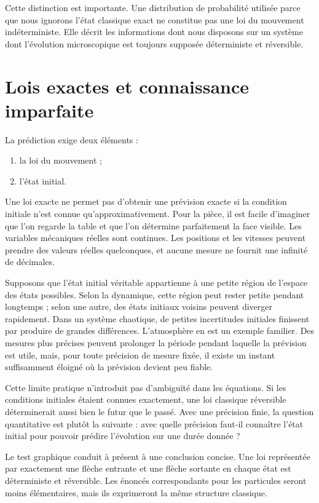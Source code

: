 Cette distinction est importante. Une distribution de probabilité utilisée parce que nous ignorons l’état classique exact ne constitue pas une loi du mouvement indéterministe. Elle décrit les informations dont nous disposons sur un système dont l’évolution microscopique est toujours supposée déterministe et réversible.

\section{Lois exactes et connaissance imparfaite}

La prédiction exige deux éléments :
\begin{enumerate}
  \item la loi du mouvement ;
  \item l’état initial.
\end{enumerate}
Une loi exacte ne permet pas d’obtenir une prévision exacte si la condition initiale n’est connue qu’approximativement. Pour la pièce, il est facile d’imaginer que l’on regarde la table et que l’on détermine parfaitement la face visible. Les variables mécaniques réelles sont continues. Les positions et les vitesses peuvent prendre des valeurs réelles quelconques, et aucune mesure ne fournit une infinité de décimales.

Supposons que l’état initial véritable appartienne à une petite région de l’espace des états possibles. Selon la dynamique, cette région peut rester petite pendant longtemps ; selon une autre, des états initiaux voisins peuvent diverger rapidement. Dans un système chaotique, de petites incertitudes initiales finissent par produire de grandes différences. L’atmosphère en est un exemple familier. Des mesures plus précises peuvent prolonger la période pendant laquelle la prévision est utile, mais, pour toute précision de mesure fixée, il existe un instant suffisamment éloigné où la prévision devient peu fiable.

Cette limite pratique n’introduit pas d’ambiguïté dans les équations. Si les conditions initiales étaient connues exactement, une loi classique réversible déterminerait aussi bien le futur que le passé. Avec une précision finie, la question quantitative est plutôt la suivante : avec quelle précision faut-il connaître l’état initial pour pouvoir prédire l’évolution sur une durée donnée ?

Le test graphique conduit à présent à une conclusion concise. Une loi représentée par exactement une flèche entrante et une flèche sortante en chaque état est déterministe et réversible. Les énoncés correspondants pour les particules seront moins élémentaires, mais ils exprimeront la même structure classique.

